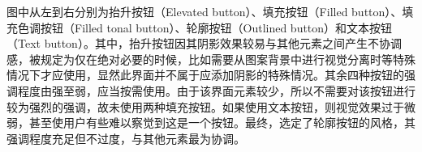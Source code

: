\begin{figure}[ht]
    \label{fig:buttons}
\end{figure}

图中从左到右分别为抬升按钮（Elevated button）、填充按钮（Filled button）、填充色调按钮（Filled tonal button）、轮廓按钮（Outlined button）和文本按钮（Text button）。其中，抬升按钮因其阴影效果较易与其他元素之间产生不协调感，被规定为仅在绝对必要的时候，比如需要从图案背景中进行视觉分离时等特殊情况下才应使用，显然此界面并不属于应添加阴影的特殊情况。其余四种按钮的强调程度由强至弱，应当按需使用。由于该界面元素较少，所以不需要对该按钮进行较为强烈的强调，故未使用两种填充按钮。如果使用文本按钮，则视觉效果过于微弱，甚至使用户有些难以察觉到这是一个按钮。最终，选定了轮廓按钮的风格，其强调程度充足但不过度，与其他元素最为协调。

